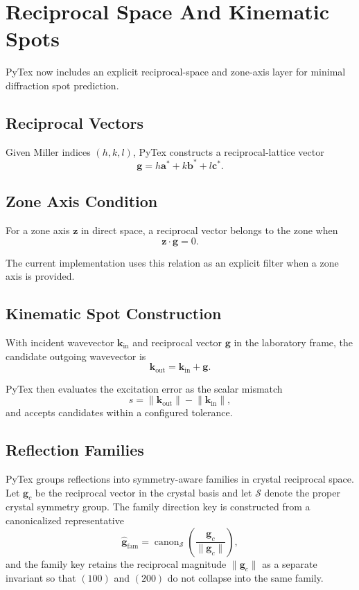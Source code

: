 \section{Reciprocal Space And Kinematic Spots}

PyTex now includes an explicit reciprocal-space and zone-axis layer for minimal diffraction spot prediction.

\subsection{Reciprocal Vectors}

Given Miller indices $(h,k,l)$, PyTex constructs a reciprocal-lattice vector
\[
  \mathbf{g} = h \mathbf{a}^\ast + k \mathbf{b}^\ast + l \mathbf{c}^\ast.
\]

\subsection{Zone Axis Condition}

For a zone axis $\mathbf{z}$ in direct space, a reciprocal vector belongs to the zone when
\[
  \mathbf{z} \cdot \mathbf{g} = 0.
\]

The current implementation uses this relation as an explicit filter when a zone axis is provided.

\subsection{Kinematic Spot Construction}

With incident wavevector $\mathbf{k}_{\mathrm{in}}$ and reciprocal vector $\mathbf{g}$ in the laboratory frame, the candidate outgoing wavevector is
\[
  \mathbf{k}_{\mathrm{out}} = \mathbf{k}_{\mathrm{in}} + \mathbf{g}.
\]

PyTex then evaluates the excitation error as the scalar mismatch
\[
  s = \lVert \mathbf{k}_{\mathrm{out}} \rVert - \lVert \mathbf{k}_{\mathrm{in}} \rVert,
\]
and accepts candidates within a configured tolerance.

\subsection{Reflection Families}

PyTex groups reflections into symmetry-aware families in crystal reciprocal space. Let $\mathbf{g}_c$ be the reciprocal vector in the crystal basis and let $\mathcal{S}$ denote the proper crystal symmetry group. The family direction key is constructed from a canonicalized representative
\[
  \widehat{\mathbf{g}}_{\mathrm{fam}} =
  \operatorname{canon}_{\mathcal{S}}\!\left(
    \frac{\mathbf{g}_c}{\lVert \mathbf{g}_c \rVert}
  \right),
\]
and the family key retains the reciprocal magnitude $\lVert \mathbf{g}_c \rVert$ as a separate invariant so that $(100)$ and $(200)$ do not collapse into the same family.

